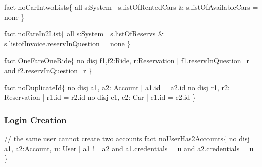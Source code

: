 \documentclass[a4paper]{article}
\begin{document}
fact noCarIntwoLists\{ \newline 
\hspace*{5 mm}	all s:System | \newline
\hspace*{5 mm}	s.listOfRentedCars \& s.listOfAvailableCars = none \newline
\} \newline

fact noFareIn2List\{ \newline
\hspace*{5 mm}	all s:System | \newline 
\hspace*{5 mm}	s.listOfReservs \& s.listofInvoice.reservInQuestion = none \newline	
\} \newline

fact OneFareOneRide\{\newline
\hspace*{5 mm}	no disj f1,f2:Ride, r:Reservation |  f1.reservInQuestion=r and  f2.reservInQuestion=r \newline
\} \newline

fact noDuplicateId\{ \newline
\hspace*{5 mm}	no disj a1, a2: Account | a1.id = a2.id \newline
\hspace*{5 mm}	no disj r1, r2: Reservation | r1.id = r2.id \newline
\hspace*{5 mm}	no disj c1, c2: Car | c1.id = c2.id \newline
\} \newline

\rmfamily
\subsubsection{Login Creation}

\ttfamily
// the same user cannot create two accounts  \newline
fact noUserHas2Accounts\{  \newline 
\hspace*{5 mm}	no disj a1, a2:Account, u: User | a1 != a2 and a1.credentials = u \hspace*{5 mm} and a2.credentials = u  \newline
\}  \newline
\end{document}
